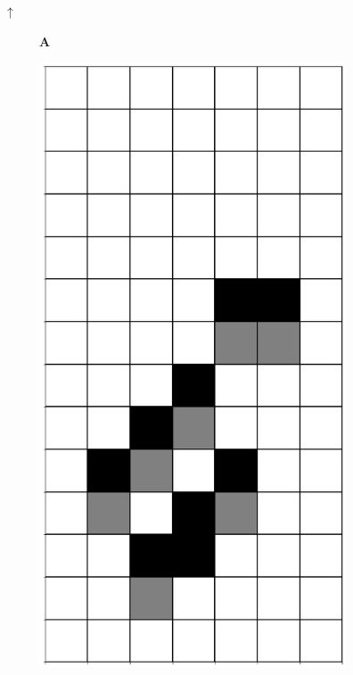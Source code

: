 \documentclass[12pt]{article}
\numberwithin{figure}{section} %
\begin{document}
\begin{figure}[H]
\begin{center}
{\Huge$\uparrow$}
\end{center}
     	\begin{subfigure}[t]{0.03\textwidth}
    		\textbf{A}
  	\end{subfigure}	
 	\begin{subfigure}{0.18\textwidth}
     		\centering
     		\includegraphics[width=\linewidth]{Section4/15.0}

\end{subfigure}
\end{figure}
\end{document}
